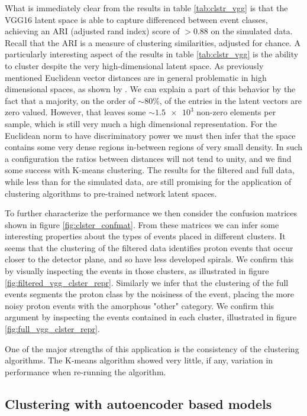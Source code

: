 What is immediately clear from the results in table \ref{tab:clstr_vgg} is that the VGG16 latent space is able to capture differenced between event classes, achieving an ARI (adjusted rand index) score of $>0.88$ on the simulated data. Recall that the ARI is a measure of clustering similarities, adjusted for chance. A particularly interesting aspect of the results in  table \ref{tab:clstr_vgg} is the ability to cluster despite the very high-dimensional latent space. As previously mentioned Euclidean vector distances are in general problematic in high dimensional spaces, as shown by \cite{Aggarwal}. We can explain a part of this behavior by the fact that a majority, on the order of $\sim 80\%$, of the entries in the latent vectors are zero valued. However, that leaves some $\sim \num{1.5e3}$ non-zero elements per sample, which is still very much a high dimensional representation. For the Euclidean norm to have discriminatory power we must then infer that the space contains some very dense regions in-between regions of very small density. In such a configuration the ratios between distances will not tend to unity, and we find some success with K-means clustering. The results for the filtered and full data, while less than for the simulated data, are still promising for the application of clustering algorithms to pre-trained network latent spaces.

To further characterize the performance we then consider the confusion matrices shown in figure \ref{fig:clster_confmat}. From these matrices we can infer some interesting properties about the types of events placed in different clusters. It seems that the clustering of the filtered data identifies proton events that occur closer to the detector plane, and so have less developed spirals. We confirm this by visually inspecting the events in those clusters, as illustrated in figure \ref{fig:filtered_vgg_clster_repr}. Similarly we infer that the clustering of the full events segments the proton class by the noisiness of the event, placing the more noisy proton events with the amorphous "other" category. We confirm this argument by inspecting the events contained in each cluster, illustrated in figure \ref{fig:full_vgg_clster_repr}.

One of the major strengths of this application is the consistency of the clustering algorithms. The K-means algorithm showed very little, if any, variation in performance when re-running the algorithm. 

\subsection{Clustering with autoencoder based models}

